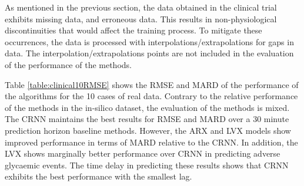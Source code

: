 \documentclass[a4paper, 10 pt, twocolumn]{IEEEtran}
\begin{document}
As mentioned in the previous section, the data obtained in the clinical trial exhibits missing data, and erroneous data. This results in non-physiological discontinuities that would affect the training process. To
mitigate these occurrences, the data is processed with interpolations/extrapolations for gaps in data. The interpolation/extrapolations points are not included in the evaluation of the performance of the methods.

\begin{comment}
\begin{table}[ht]
\small{
\caption{A table showing the effect of \\extra features on CRNN performance }\label{table:FeatureAblation}
\centering
\begin{tabular}{|l|c|c|}
\hline
\multirow{2}{4em}{Features} & \multicolumn{2}{|c|}{Prediction Horizon} \\
\cline{2-3}
& 30 min  & 60 min\\
\hline
G, I, M  & $21.07 \pm 2.35$ & $33.27\pm 4.79$\\
\hline
G, I, M, E  & $21.46 \pm 2.97$ & $35.05\pm 4.77$\\
\hline
G, I, M, ToD  & $21.61 \pm 2.66$ & $35.65\pm 6.01$\\
\hline
G, I, M, E, ToD  & $22.70 \pm 3.23$ & $36.54\pm 7.14$\\
\hline
\end{tabular}
}
\centering
\end{table}
\end{comment}


Table \ref{table:clinical10RMSE} shows the RMSE and MARD of the performance of the algorithms for the {10} cases of real data.
 {Contrary to the relative performance of the methods in the in-silico dataset, the evaluation of the methods is mixed}. {The CRNN maintains the best results for RMSE and MARD over a 30 minute prediction horizon baseline
 methods. However, the ARX and LVX models show improved performance in terms of MARD relative to the CRNN. In addition, the LVX shows marginally better performance over CRNN in predicting adverse glycaemic events. The
 time delay in predicting these results shows that CRNN exhibits the best performance with the smallest lag.}
\end{document}
